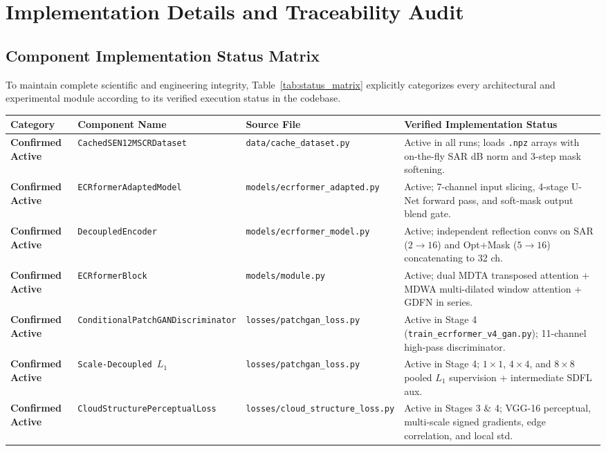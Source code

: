 \chapter{Implementation Details and Traceability Audit}
\label{chap:appendix_traceability}

\section{Component Implementation Status Matrix}
To maintain complete scientific and engineering integrity, Table~\ref{tab:status_matrix} explicitly categorizes every architectural and experimental module according to its verified execution status in the codebase.

\begin{table}[htbp]
\centering
\small
\begin{tabularx}{\textwidth}{llp{3.5cm}X}
\toprule
\textbf{Category} & \textbf{Component Name} & \textbf{Source File} & \textbf{Verified Implementation Status} \\
\midrule
\textbf{Confirmed Active} & \texttt{CachedSEN12MSCRDataset} & \texttt{data/cache\_dataset.py} & Active in all runs; loads \texttt{.npz} arrays with on-the-fly SAR dB norm and 3-step mask softening. \\
\textbf{Confirmed Active} & \texttt{ECRformerAdaptedModel} & \texttt{models/ecrformer\_adapted.py} & Active; 7-channel input slicing, 4-stage U-Net forward pass, and soft-mask output blend gate. \\
\textbf{Confirmed Active} & \texttt{DecoupledEncoder} & \texttt{models/ecrformer\_model.py} & Active; independent reflection convs on SAR ($2\to 16$) and Opt+Mask ($5\to 16$) concatenating to 32 ch. \\
\textbf{Confirmed Active} & \texttt{ECRformerBlock} & \texttt{models/module.py} & Active; dual MDTA transposed attention + MDWA multi-dilated window attention + GDFN in series. \\
\textbf{Confirmed Active} & \texttt{ConditionalPatchGANDiscriminator} & \texttt{losses/patchgan\_loss.py} & Active in Stage 4 (\texttt{train\_ecrformer\_v4\_gan.py}); 11-channel high-pass discriminator. \\
\textbf{Confirmed Active} & \texttt{Scale-Decoupled $L_1$} & \texttt{losses/patchgan\_loss.py} & Active in Stage 4; $1\times 1$, $4\times 4$, and $8\times 8$ pooled $L_1$ supervision + intermediate SDFL aux. \\
\textbf{Confirmed Active} & \texttt{CloudStructurePerceptualLoss} & \texttt{losses/cloud\_structure\_loss.py} & Active in Stages 3 \& 4; VGG-16 perceptual, multi-scale signed gradients, edge correlation, and local std. \\

\end{tabularx}
\end{table}
